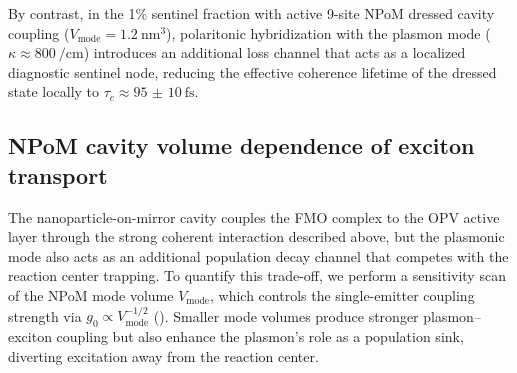 \documentclass[12pt]{iopart}
\begin{document}
By contrast, in the 1\% sentinel fraction with active 9-site NPoM dressed cavity coupling ($V_{\mathrm{mode}} = \qty{1.2}{\nm\cubed}$), polaritonic hybridization with the plasmon mode ($\kappa \approx \qty{800}{\per\cm}$) introduces an additional loss channel that acts as a localized diagnostic sentinel node, reducing the effective coherence lifetime of the dressed state locally to $\tau_c \approx \qty{95(10)}{\fs}$.

\subsection{NPoM cavity volume dependence of exciton transport}

The nanoparticle-on-mirror cavity couples the FMO complex to the OPV active layer through the strong coherent interaction described above, but the plasmonic mode also acts as an additional population decay channel that competes with the reaction center trapping.
To quantify this trade-off, we perform a sensitivity scan of the NPoM mode volume $V_{\mathrm{mode}}$, which controls the single-emitter coupling strength via $g_0 \propto V_{\mathrm{mode}}^{-1/2}$ ().
Smaller mode volumes produce stronger plasmon--exciton coupling but also enhance the plasmon's role as a population sink, diverting excitation away from the reaction center.
\end{document}
